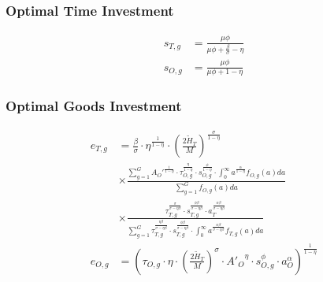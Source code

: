 \documentclass[11pt]{beamer}
\begin{document}
		
		\begin{frame}
			\frametitle{Optimal Time Investment} 
			\label{time_inv}
			\begin{align}
				s_{T,g} & = \frac{\mu \phi}{\mu \phi+\tfrac{\beta}{\sigma}-\eta} \nonumber\\
				s_{O,g} & = \frac{\mu \phi}{\mu \phi+1-\eta} \nonumber
			\end{align}
			\hyperlink{eqm}{}
		\end{frame}
		
		\begin{frame}
			\frametitle{Optimal Goods Investment} 
			\label{good_inv}
			\begin{align}
				e_{T,g} & = \tfrac{\beta}{\sigma}\cdot\eta^{\frac{1}{1-\eta}}\cdot \left(\tfrac{2\widetilde{H}_T}{M}\right)^{\frac{\sigma}{1-\eta}} \nonumber\\
				& \times \frac{\sum_{g=1}^G {A_O'}^\frac{1}{1-\eta}\cdot\tau_{O,g}^\frac{\eta}{1-\eta} \cdot s_{O,g}^\frac{\phi}{1-\eta}\cdot \int_0^\infty a^{\frac{\alpha}{1-\eta}} f_{O,g}(a)da}{\sum_{g=1}^G f_{O,g}(a)da} \nonumber\\
				& \times \frac{\tau_{T,g}^\frac{\sigma}{\sigma-\eta\beta } \cdot s_{T,g}^\frac{\phi\beta }{\sigma-\eta\beta } \cdot a_T^\frac{\alpha\beta }{\sigma-\eta\beta}}{\sum_{g=1}^G \tau_{T,g}^\frac{\eta\beta }{\sigma-\eta\beta } \cdot s_{T,g}^\frac{\phi\beta }{\sigma-\eta\beta } \cdot \int_0^\infty a^\frac{\alpha\beta}{\sigma-\eta\beta } f_{T,g}(a)da} \nonumber\\
				e_{O,g} & = \left( \tau_{O,g} \cdot \eta \cdot \left(\tfrac{2\widetilde{H}_T}{M}\right)^\sigma\cdot {A'_{O}}^\eta \cdot s_{O,g}^\phi \cdot a_O^\alpha \right)^{\frac{1}{1-\eta}} \nonumber
			\end{align}
			\hyperlink{eqm}{\beamergotobutton{Back}}
		\end{frame}
		
\end{document}
